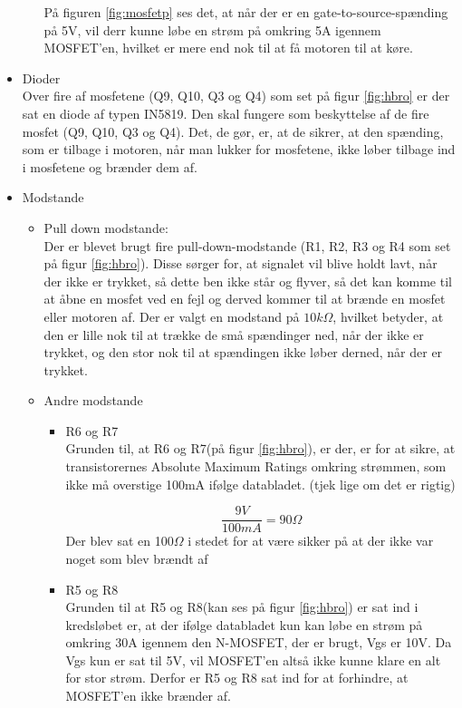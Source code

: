 \begin{itemize}
\begin{itemize}
	På figuren \ref{fig:mosfetp} ses det, at når der er en gate-to-source-spænding på 5V, vil derr kunne løbe en strøm på omkring 5A igennem MOSFET'en, hvilket er mere end nok til at få motoren til at køre. 
	
\end{itemize}

\item Dioder \\
Over fire af mosfetene (Q9, Q10, Q3 og Q4) som set på figur \ref{fig:hbro} er der sat en diode af typen IN5819. Den skal fungere som beskyttelse af de fire mosfet (Q9, Q10, Q3 og Q4). Det, de gør, er, at de sikrer, at den spænding, som er tilbage i motoren, når man lukker for mosfetene, ikke løber tilbage ind i mosfetene og brænder dem af.

\item Modstande \\
\begin{itemize}
	\item Pull down modstande:\\
	Der er blevet brugt fire pull-down-modstande (R1, R2, R3 og R4 som set på figur \ref{fig:hbro}). Disse sørger for, at signalet vil blive holdt lavt, når der ikke er trykket, så dette ben ikke står og flyver, så det kan komme til at åbne en mosfet ved en fejl og derved kommer til at brænde en mosfet eller motoren af. Der er valgt en modstand på $10k\Omega$, hvilket betyder, at den er lille nok til at trække de små spændinger ned, når der ikke er trykket, og den stor nok til at spændingen ikke løber derned, når der er trykket. 
	\item Andre modstande
	\begin{itemize}
		\item R6 og R7\\
			Grunden til, at R6 og R7(på figur \ref{fig:hbro}), er der, er for at sikre, at transistorernes Absolute Maximum Ratings omkring strømmen, som ikke må overstige 100mA ifølge databladet. (tjek lige om det er rigtig)
		
			
			\begin{displaymath}
			\frac {9V}{100mA} 	=90\Omega
			\end{displaymath}
			Der blev sat en 100$\Omega$ i stedet for at være sikker på at der ikke var noget som blev brændt af
		\item R5 og R8\\
			Grunden til at R5 og R8(kan ses på figur \ref{fig:hbro}) er sat ind i kredsløbet er, at der ifølge databladet kun kan løbe en strøm på omkring 30A igennem den N-MOSFET, der er brugt, Vgs er 10V. Da Vgs kun er sat til 5V, vil MOSFET'en altså ikke kunne klare en alt for stor strøm. Derfor er R5 og R8 sat ind for at forhindre, at MOSFET'en ikke brænder af.
	\end{itemize}
\end{itemize}


\end{itemize}
